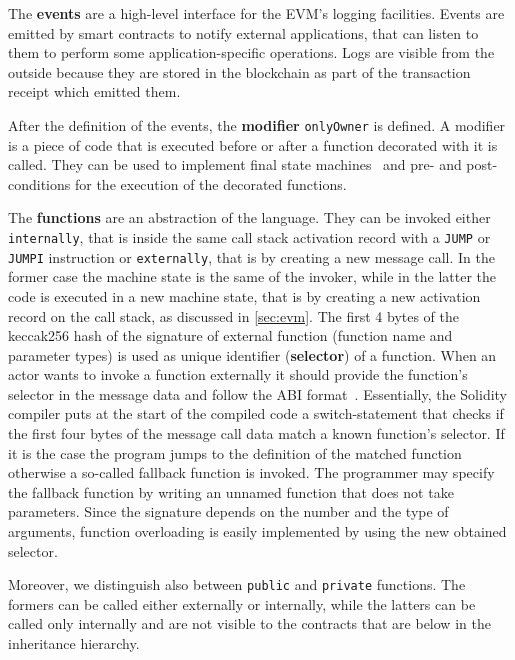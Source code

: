 The \textbf{events} are a high-level interface for the EVM's logging 
facilities. Events are emitted by smart contracts to notify external 
applications, that can listen to them to perform some application-specific
operations. Logs are visible from the outside because they are stored
in the blockchain as part of the transaction receipt which emitted them.

After the definition of the events, the \textbf{modifier} \verb|onlyOwner| is
defined. A modifier is a piece of code that is executed before or after a 
function decorated with it is called. They can be used to implement final
state machines~\cite{bib:solidity-docs} and pre- and post-conditions for the
execution of the decorated functions.

The \textbf{functions} are an abstraction of the language. They can be invoked 
either \texttt{internally}, that is inside the same call stack activation record
with a \texttt{JUMP} or \texttt{JUMPI} instruction or \texttt{externally}, that 
is by creating a new message call. In the former case the machine state is the 
same of the invoker, while in the latter the code is executed in a new machine 
state, that is by creating a new activation record on the call stack, as 
discussed in \autoref{sec:evm}. The first 4 bytes of the keccak256 hash of the 
signature of external function (function name and parameter types) is used as 
unique identifier (\textbf{selector}) of a function. When an actor wants to 
invoke a function externally it should provide the function's selector in the 
message data and follow the ABI format~\cite{bib:solidity-docs}. Essentially, 
the Solidity compiler puts at the start of the compiled code a switch-statement 
that checks if the first four bytes of the message call data match a known
function's selector. If it is the case the program jumps to the definition of 
the matched function otherwise a so-called fallback function is invoked. The 
programmer may specify the fallback function by writing an unnamed function 
that does not take parameters. Since the signature depends on the number and 
the type of arguments, function overloading is easily implemented by using the 
new obtained selector.

Moreover, we distinguish also between \texttt{public} and \texttt{private}
functions. The formers can be called either externally or internally, while the
latters can be called only internally and are not visible to the contracts that
are below in the inheritance hierarchy.

